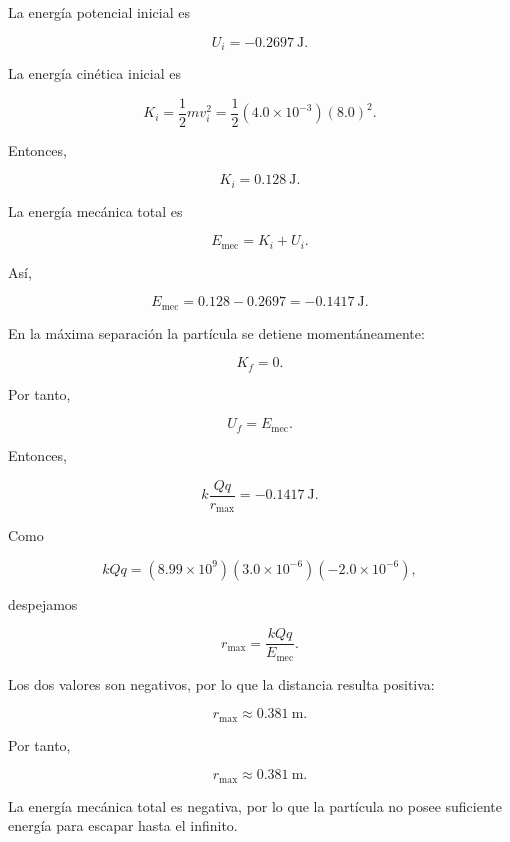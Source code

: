 \begin{explicacion}

La energía potencial inicial es

\[
U_i=-\SI{0.2697}{\joule}.
\]

La energía cinética inicial es

\[
K_i
=
\frac12mv_i^2
=
\frac12(4.0\times10^{-3})(8.0)^2.
\]

Entonces,

\[
K_i=\SI{0.128}{\joule}.
\]

La energía mecánica total es

\[
E_{\text{mec}}
=
K_i+U_i.
\]

Así,

\[
E_{\text{mec}}
=
0.128-0.2697
=
-\SI{0.1417}{\joule}.
\]

En la máxima separación la partícula se detiene momentáneamente:

\[
K_f=0.
\]

Por tanto,

\[
U_f=E_{\text{mec}}.
\]

Entonces,

\[
k\frac{Qq}{r_{\max}}
=
-\SI{0.1417}{\joule}.
\]

Como

\[
kQq
=
(8.99\times10^9)
(3.0\times10^{-6})(-2.0\times10^{-6}),
\]

despejamos

\[
r_{\max}
=
\frac{kQq}{E_{\text{mec}}}.
\]

Los dos valores son negativos, por lo que la distancia resulta positiva:

\[
r_{\max}
\approx
\SI{0.381}{\metre}.
\]

Por tanto,

\[
\boxed{r_{\max}\approx\SI{0.381}{\metre}}.
\]

La energía mecánica total es negativa, por lo que la partícula no posee suficiente
energía para escapar hasta el infinito.

\end{explicacion}